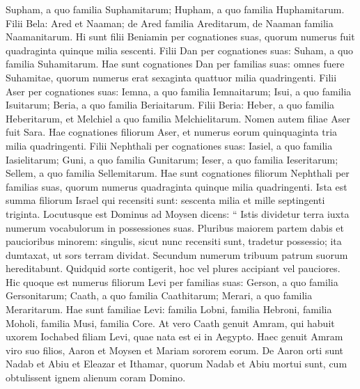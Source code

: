 \begin{biblechapter}
\begin{biblechapter}
\begin{biblechapter}
\begin{biblechapter}
\begin{biblechapter}
\begin{biblechapter}
\begin{biblechapter}
\begin{biblechapter}
\begin{biblechapter}
\begin{biblechapter}
\begin{biblechapter}
\begin{biblechapter}
\begin{biblechapter}
\begin{biblechapter}
\begin{biblechapter}
\begin{biblechapter}
\begin{biblechapter}
\begin{biblechapter}
\begin{biblechapter}
\begin{biblechapter}
\begin{biblechapter}
\begin{biblechapter}
\begin{biblechapter}
\begin{biblechapter}
\begin{biblechapter}
\begin{biblechapter}
\verse Supham, a quo familia Suphamitarum; Hupham, a quo familia Huphamitarum. 
\verse Filii Bela: Ared et Naaman; de Ared familia Areditarum, de Naaman familia Naamanitarum. 
 \verse Hi sunt filii Beniamin per cognationes suas, quorum numerus fuit quadraginta quinque milia sescenti.
 \verse Filii Dan per cognationes suas: Suham, a quo familia Suhamitarum. Hae sunt cognationes Dan per familias suas: 
\verse omnes fuere Suhamitae, quorum numerus erat sexaginta quattuor milia quadringenti.
 \verse Filii Aser per cognationes suas: Iemna, a quo familia Iemnaitarum; Isui, a quo familia Isuitarum; Beria, a quo familia Beriaitarum. 
\verse Filii Beria: Heber, a quo familia Heberitarum, et Melchiel a quo familia Melchielitarum. 
 \verse Nomen autem filiae Aser fuit Sara. 
\verse Hae cognationes filiorum Aser, et numerus eorum quinquaginta tria milia quadringenti.
 \verse Filii Nephthali per cognationes suas: Iasiel, a quo familia Iasielitarum; Guni, a quo familia Gunitarum; 
\verse Ieser, a quo familia Ieseritarum; Sellem, a quo familia Sellemitarum. 
\verse Hae sunt cognationes filiorum Nephthali per familias suas, quorum numerus quadraginta quinque milia quadringenti.
 \verse Ista est summa filiorum Israel qui recensiti sunt: sescenta milia et mille septingenti triginta.
 \verse Locutusque est Dominus ad Moysen dicens: 
\verse “ Istis dividetur terra iuxta numerum vocabulorum in possessiones suas. 
\verse Pluribus maiorem partem dabis et paucioribus minorem: singulis, sicut nunc recensiti sunt, tradetur possessio; 
 \verse ita dumtaxat, ut sors terram dividat. Secundum numerum tribuum patrum suorum hereditabunt. 
\verse Quidquid sorte contigerit, hoc vel plures accipiant vel pauciores.
 \verse Hic quoque est numerus filiorum Levi per familias suas: Gerson, a quo familia Gersonitarum; Caath, a quo familia Caathitarum; Merari, a quo familia Meraritarum. 
\verse Hae sunt familiae Levi: familia Lobni, familia Hebroni, familia Moholi, familia Musi, familia Core. At vero Caath genuit Amram, 
\verse qui habuit uxorem Iochabed filiam Levi, quae nata est ei in Aegypto. Haec genuit Amram viro suo filios, Aaron et Moysen et Mariam sororem eorum. 
\verse De Aaron orti sunt Nadab et Abiu et Eleazar et Ithamar, 
\verse quorum Nadab et Abiu mortui sunt, cum obtulissent ignem alienum coram Domino.

\end{biblechapter}
\end{biblechapter}
\end{biblechapter}
\end{biblechapter}
\end{biblechapter}
\end{biblechapter}
\end{biblechapter}
\end{biblechapter}
\end{biblechapter}
\end{biblechapter}
\end{biblechapter}
\end{biblechapter}
\end{biblechapter}
\end{biblechapter}
\end{biblechapter}
\end{biblechapter}
\end{biblechapter}
\end{biblechapter}
\end{biblechapter}
\end{biblechapter}
\end{biblechapter}
\end{biblechapter}
\end{biblechapter}
\end{biblechapter}
\end{biblechapter}
\end{biblechapter}

